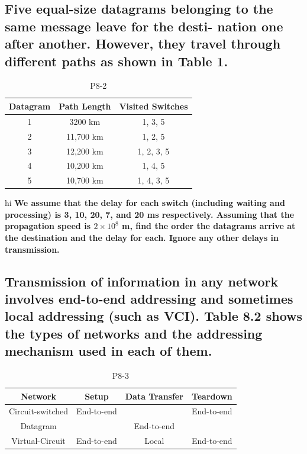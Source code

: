 \documentclass{article}
\begin{document}
\subsection{Five equal-size datagrams belonging to the same message leave for the desti-
	nation one after another. However, they travel through different paths as
	shown in Table 1.
}
\begin{table}[H]
	\centering
	\begin{tabular}{ | c | c | c | }
		\hline
		Datagram & Path Length & Visited Switches \\
		\hline
		1        & 3200 km     & 1, 3, 5          \\
		\hline
		2        & 11,700 km   & 1, 2, 5          \\
		\hline
		3        & 12,200 km   & 1, 2, 3, 5       \\
		\hline
		4        & 10,200 km   & 1, 4, 5          \\
		\hline
		5        & 10,700 km   & 1, 4, 3, 5       \\
		\hline
	\end{tabular}
	\caption{P8-2}
	\label{table:1}
\end{table}
hi
\textbf{
	We assume that the delay for each switch (including waiting and processing)
	is 3, 10, 20, 7, and 20 ms respectively. Assuming that the propagation speed is
	$2 \times 10^8$ m, find the order the datagrams arrive at the destination and the delay
	for each. Ignore any other delays in transmission.
}

\subsection{
	Transmission of information in any network involves end-to-end addressing
	and sometimes local addressing (such as VCI). Table 8.2 shows the types of
	networks and the addressing mechanism used in each of them.
}
\begin{table}[H]
	\centering
	\begin{tabular}{ | c | c | c | c | }
		\hline
		Network          & Setup      & Data Transfer & Teardown   \\
		\hline
		Circuit-switched & End-to-end &               & End-to-end \\
		\hline
		Datagram         &            & End-to-end    &            \\
		\hline
		Virtual-Circuit  & End-to-end & Local         & End-to-end \\
		\hline
	\end{tabular}
	\caption{P8-3}
	\label{table:2}
\end{table}
\end{document}

